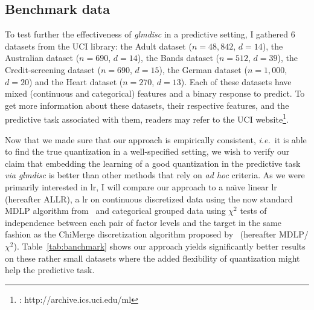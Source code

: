 \subsection{Benchmark data} \label{subsec:exp_benchmark}

To test further the effectiveness of \textit{glmdisc} in a predictive setting, I gathered 6 datasets from the UCI library: the Adult dataset ($n=48,842$, $d=14$), the Australian dataset ($n=690$, $d=14$), the Bands dataset ($n=512$, $d=39$), the Credit-screening dataset ($n=690$, $d=15$), the German dataset ($n=1,000$, $d=20$) and the Heart dataset ($n=270$, $d=13$). Each of these datasets have mixed (continuous and categorical) features and a binary response to predict. To get more information about these datasets, their respective features, and the predictive task associated with them, readers may refer to the UCI website\footnote{\cite{Dua:2017} : http://archive.ics.uci.edu/ml}.

Now that we made sure that our approach is empirically consistent, \textit{i.e.}\ it is able to find the true quantization in a well-specified setting, we wish to verify our claim that embedding the learning of a good quantization in the predictive task \textit{via glmdisc} is better than other methods that rely on \textit{ad hoc} criteria. As we were primarily interested in \gls{lr}, I will compare our approach to a na\"{\i}ve linear \gls{lr} (hereafter ALLR), a \gls{lr} on continuous discretized data using the now standard MDLP algorithm from~\cite{fayyad1993multi} and categorical grouped data using $\chi^2$ tests of independence between each pair of factor levels and the target in the same fashion as the ChiMerge discretization algorithm proposed by~\cite{kerber1992chimerge} (hereafter MDLP/$\chi^2$). Table~\ref{tab:banchmark} shows our approach yields significantly better results on these rather small datasets where the added flexibility of quantization might help the predictive task.

